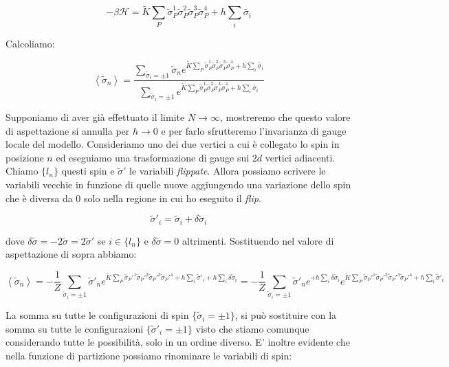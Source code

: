 \documentclass[12pt,a4paper]{article}
\begin{document}
\begin{equation}
-\beta \mathcal{H} = \tilde{K} \sum_{P} \tilde{\sigma}_P^1 \tilde{\sigma}_P^2 \tilde{\sigma}_P^3 \tilde{\sigma}_P^4 + h \sum_{i} \tilde{\sigma_i}
\end{equation}

Calcoliamo:

\begin{equation}
\left< \tilde{\sigma}_n \right> = \frac{\sum_{ {\tilde{\sigma}_i = \pm 1}} \tilde{\sigma}_n e^{\tilde{K} \sum_{P} \tilde{\sigma}_P^1 \tilde{\sigma}_P^2 \tilde{\sigma}_P^3 \tilde{\sigma}_P^4 + h \sum_{i} \tilde{\sigma_i}}}{ \sum_{ {\tilde{\sigma}_i = \pm 1}} e^{\tilde{K} \sum_{P} \tilde{\sigma}_P^1 \tilde{\sigma}_P^2 \tilde{\sigma}_P^3 \tilde{\sigma}_P^4 + h \sum_{i} \tilde{\sigma_i}}
}
\end{equation}

Supponiamo di aver già effettuato il limite $N \rightarrow \infty$, mostreremo che questo valore di aspettazione si annulla per $h \rightarrow 0$ e per farlo sfrutteremo l'invarianza di gauge locale del modello. Consideriamo uno dei due vertici a cui è collegato lo spin in posizione $n$ ed eseguiamo una trasformazione di gauge sui $2d$ vertici adiacenti. Chiamo $\lbrace l_n \rbrace$ questi spin e $\tilde{\sigma}'$ le variabili \emph{flippate}. Allora possiamo scrivere le variabili vecchie in funzione di quelle nuove aggiungendo una variazione dello spin che è diversa da 0 solo nella regione in cui ho eseguito il \emph{flip}.

\begin{equation}
\tilde{\sigma}'_i = \tilde{\sigma}_i + \delta \tilde{\sigma}_i
\end{equation}

dove $\delta \tilde{\sigma} = - 2 \tilde{\sigma} = 2 \tilde{\sigma}'$ se $i \in \lbrace l_n \rbrace$ e $\delta \tilde{\sigma} = 0$ altrimenti. Sostituendo nel valore di aspettazione di sopra abbiamo:

\[
\left< \tilde{\sigma}_n \right> = - \frac{1}{Z}\sum_{ {\tilde{\sigma}_i = \pm 1}} \tilde{\sigma}'_n e^{\tilde{K} \sum_{P} \tilde{\sigma}_P'^1 \tilde{\sigma}_P'^2 \tilde{\sigma}_P'^3 \tilde{\sigma}_P'^4 + h \sum_{i} \tilde{\sigma}'_i + h \sum_{i} \delta \tilde{\sigma}_i} =  - \frac{1}{Z}\sum_{ {\tilde{\sigma}_i = \pm 1}} \tilde{\sigma}'_n  e^{+ h \sum_{i} \delta \tilde{\sigma}_i}  e^{\tilde{K} \sum_{P} \tilde{\sigma}_P'^1 \tilde{\sigma}_P'^2 \tilde{\sigma}_P'^3 \tilde{\sigma}_P'^4 + h \sum_{i} \tilde{\sigma}'_i}
\]

La somma su tutte le configurazioni di spin $\lbrace \tilde{\sigma}_i = \pm 1 \rbrace$, si può sostituire con la somma su tutte le configurazioni $\lbrace \tilde{\sigma}'_i = \pm 1 \rbrace$ visto che stiamo comunque considerando tutte le possibilità, solo in un ordine diverso. E' inoltre evidente che nella funzione di partizione possiamo rinominare le variabili di spin:
\end{document}
